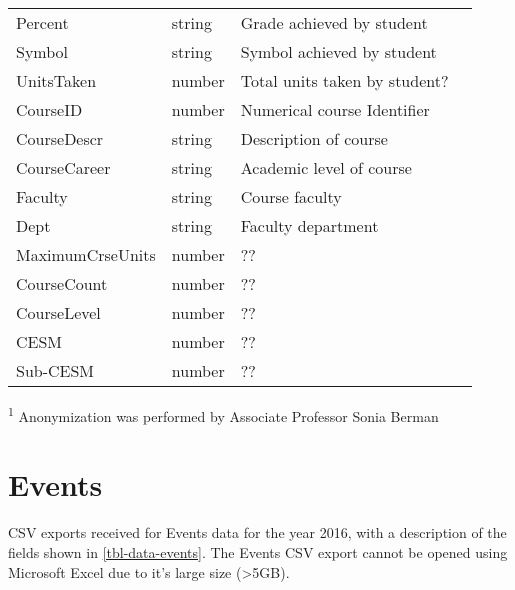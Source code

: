 \begin{table}[H]
\begin{threeparttable}
\begin{tabularx}{\textwidth}{>{\hsize}Y>{\hsize}X>{\hsize}X>{\hsize}X}
            Percent            & string            & Grade achieved by student                            \\
            Symbol             & string            & Symbol achieved by student                           \\
            UnitsTaken         & number            & Total units taken by student?                        \\
            CourseID           & number            & Numerical course Identifier                          \\
            CourseDescr        & string            & Description of course                                \\
            CourseCareer       & string            & Academic level of course                             \\
            Faculty            & string            & Course faculty                                       \\
            Dept               & string            & Faculty department                                   \\
            MaximumCrseUnits   & number            & ??                                                   \\
            CourseCount        & number            & ??                                                   \\
            CourseLevel        & number            & ??                                                   \\
            CESM               & number            & ??                                                   \\
            Sub-CESM           & number            & ??                                                   \\
            \bottomrule
        \end{tabularx}
        \scriptsize
        \begin{tablenotes}
            \item[\textsuperscript{1}]Anonymization was performed by Associate Professor Sonia Berman
        \end{tablenotes}
    \end{threeparttable}
\end{table}


\section{Events}
CSV exports received for Events data for the year 2016, with a description of the fields shown in \ref{tbl-data-events}. The Events CSV export cannot be opened using Microsoft Excel due to it's large size (\textgreater 5GB).

